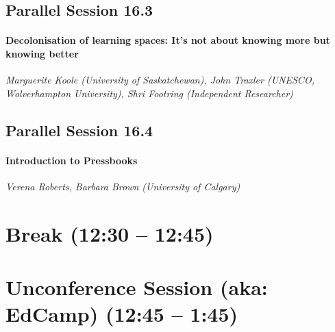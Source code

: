 \documentclass[
]{book}
\begin{document}
\hypertarget{parallel-session-16.3}{%
\subsection*{Parallel Session 16.3}\label{parallel-session-16.3}}

\begin{todo}
\hypertarget{decolonisation-of-learning-spaces-its-not-about-knowing-more-but-knowing-better}{%
\paragraph{Decolonisation of learning spaces: It's not about knowing
more but knowing
better}\label{decolonisation-of-learning-spaces-its-not-about-knowing-more-but-knowing-better}}

\emph{Marguerite Koole (University of Saskatchewan), John Traxler
(UNESCO, Wolverhampton University), Shri Footring (Independent
Researcher)}
\end{todo}

\hypertarget{parallel-session-16.4}{%
\subsection*{Parallel Session 16.4}\label{parallel-session-16.4}}

\begin{todo}
\hypertarget{introduction-to-pressbooks}{%
\paragraph{Introduction to
Pressbooks}\label{introduction-to-pressbooks}}

\emph{Verena Roberts, Barbara Brown (University of Calgary)}
\end{todo}

\hypertarget{break-1230-1245}{%
\section*{Break (12:30 -- 12:45)}\label{break-1230-1245}}

\hypertarget{unconference-session-aka-edcamp-1245-145}{%
\section{Unconference Session (aka: EdCamp) (12:45 -- 1:45)}\label{unconference-session-aka-edcamp-1245-145}}
\end{document}
